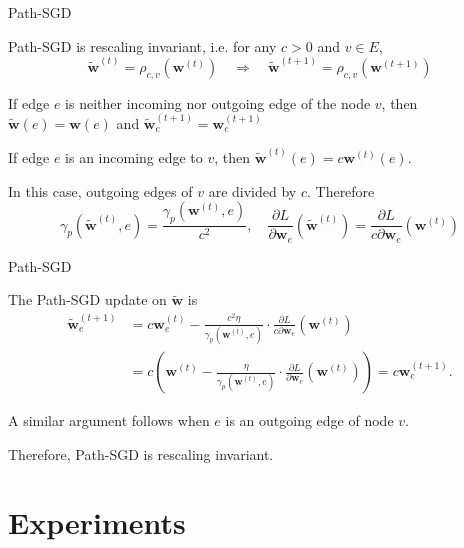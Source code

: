 \documentclass[presentation,xcolor={usenames,dvipsnames},10pt]{beamer}
\newcommand{\RSGD}{Path-SGD }
\begin{document}
\begin{frame}{\RSGD}
\begin{theorem}
	\RSGD is rescaling invariant, i.e. for any $c>0$ and $v\in E$, $$\tilde{\textbf{w}}^{(t)} = \rho_{c,v}(\textbf{w}^{(t)}) \quad \Rightarrow \quad \tilde{\textbf{w}}^{(t+1)} = \rho_{c,v}(\textbf{w}^{(t+1)})$$ 
\end{theorem}
\bit 

\item If edge $e$ is neither incoming nor outgoing edge of the node $v$, then $\tilde{\textbf{w}}(e)=\textbf{w}(e)$ and $\tilde{\textbf{w}}^{(t+1)}_e=\textbf{w}^{(t+1)}_e$

\item If edge $e$ is an incoming edge to $v$, then $\tilde{\textbf{w}}^{(t)}(e)=c\textbf{w}^{(t)}(e)$.

\item In this case, outgoing edges of $v$ are divided by $c$. Therefore 
\begin{equation*}
\gamma_p(\tilde{\textbf{w}}^{(t)},e) = \frac{\gamma_p(\textbf{w}^{(t)},e)}{c^2}, \quad  \frac{\partial L}{\partial \textbf{w}_e}(\tilde{\textbf{w}}^{(t)})= \frac{\partial L}{c\partial \textbf{w}_e}(\textbf{w}^{(t)})
\end{equation*} 

\eit 
\end{frame} 

\begin{frame}{\RSGD}
\bit 
\item The \RSGD update on $\tilde{\mathbf{w}}$ is 
\begin{align*}
{\tilde{\textbf{w}}}^{(t+1)}_e &= c\textbf{w}^{(t)}_e - \frac{c^2\eta}{\gamma_p(\textbf{w}^{(t)},e)} \cdot \frac{\partial L}{c\partial \textbf{w}_e}(\textbf{w}^{(t)})\\
&= c\left(\textbf{w}^{(t)} - \frac{\eta}{\gamma_p(\textbf{w}^{(t)},e)} \cdot \frac{\partial L}{\partial \textbf{w}_e}(\textbf{w}^{(t)})\right) = c\textbf{w}^{(t+1)}_e.
\end{align*}

\item A similar argument follows when $e$ is an outgoing edge of node $v$. 

\item Therefore, \RSGD is rescaling invariant.
\eit 
\end{frame}

\section{Experiments} 
\end{document}

